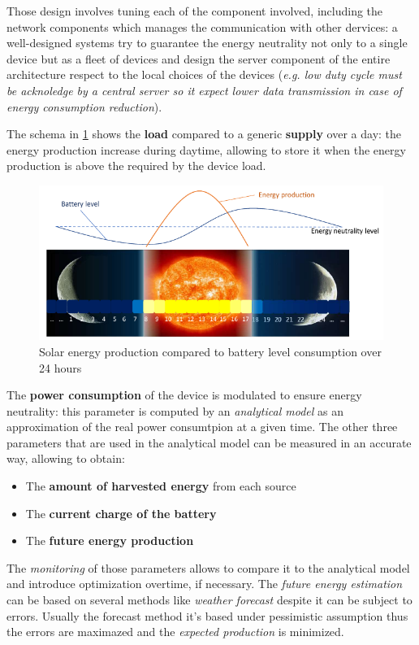 \documentclass[10pt,a4paper]{report}
\theoremstyle{definition}
\begin{document}
Those design involves tuning each of the component involved, including the network components which manages the communication with other dervices: a well-designed systems try to guarantee the energy neutrality not only to a single device but as a fleet of devices and design the server component of the entire architecture respect to the local choices of the devices (\textit{e.g. low duty cycle must be acknoledge by a central server so it expect lower data transmission in case of energy consumption reduction}).

The schema in \ref{solar-schema} shows the \textbf{load} compared to a generic \textbf{supply} over a day: the energy production increase during daytime, allowing to store it when the energy production is above the required by the device load.
\begin{figure}[h]
	\centering\includegraphics[scale=0.50]{images/Pasted image 20230509113221.png}
	\caption{Solar energy production compared to battery level consumption over 24 hours}
\label{solar-schema}	
\end{figure}


The \textbf{power consumption} of the device is modulated to ensure energy neutrality: this parameter is computed by an \textit{analytical model} as an approximation of the real power consumtpion at a given time.  The other three parameters that are used in the analytical model can be measured in an accurate way, allowing to obtain:
\begin{itemize}
	\item 
	The \textbf{amount of harvested energy} from each source
	\item 
	The \textbf{current charge of the battery}
	\item 
	The \textbf{future energy production}
\end{itemize}

The \textit{monitoring} of those parameters allows to compare it to the analytical model and introduce optimization overtime, if necessary.
The \textit{future energy estimation} can be based on several methods like \textit{weather forecast} despite it can be subject to errors. Usually the forecast method it's based under pessimistic assumption thus the errors are maximazed and the \textit{expected production} is minimized.
\end{document}
